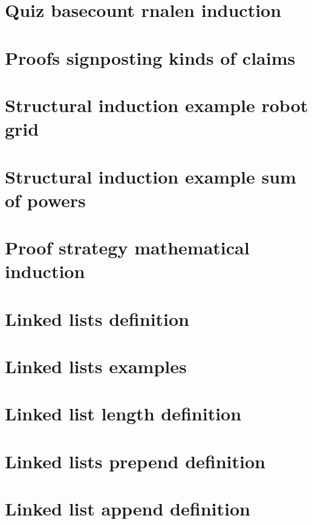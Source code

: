 \section*{Quiz basecount rnalen induction}

\vfill
\section*{Proofs signposting kinds of claims}

\vfill
\section*{Structural induction example robot grid}

\vfill
\section*{Structural induction example sum of powers}

\vfill
\section*{Proof strategy mathematical induction}

\vfill
\section*{Linked lists definition}

\vfill
\section*{Linked lists examples}

\vfill
\section*{Linked list length definition}

\vfill
\section*{Linked lists prepend definition}

\vfill
\section*{Linked list append definition}

\vfill
